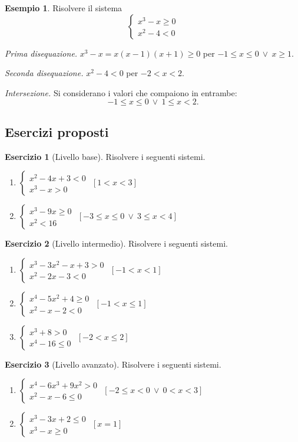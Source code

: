 \documentclass[12pt,a4paper,openany]{book}
\theoremstyle{definition}
\newtheorem{esempio}{Esempio}[section]
\newtheorem{esercizio}{Esercizio}[section]
\theoremstyle{plain}
\theoremstyle{remark}
\newcommand{\sistema}[1]{\begin{cases}#1\end{cases}}
\begin{document}
\begin{esempio}
Risolvere il sistema
\[
\sistema{x^3-x\ge 0\\ x^2-4<0}
\]

\emph{Prima disequazione.} $x^3-x=x(x-1)(x+1)\ge 0$ per $-1\le x\le 0\ \lor\ x\ge 1$.

\emph{Seconda disequazione.} $x^2-4<0$ per $-2<x<2$.

\emph{Intersezione.} Si considerano i valori che compaiono in entrambe:
\[
-1\le x\le 0\ \lor\ 1\le x<2.
\]
\end{esempio}

\subsection*{Esercizi proposti}

\begin{esercizio}[Livello base]
Risolvere i seguenti sistemi.
\begin{enumerate}[label=\alph*)]
\item $\sistema{x^2-4x+3<0\\ x^3-x>0}$ \hfill $[1<x<3]$
\item $\sistema{x^3-9x\ge 0\\ x^2<16}$ \hfill $[-3\le x\le 0\ \lor\ 3\le x<4]$
\end{enumerate}
\end{esercizio}

\begin{esercizio}[Livello intermedio]
Risolvere i seguenti sistemi.
\begin{enumerate}[label=\alph*)]
\item $\sistema{x^3-3x^2-x+3>0\\ x^2-2x-3<0}$ \hfill $[-1<x<1]$
\item $\sistema{x^4-5x^2+4\ge 0\\ x^2-x-2<0}$ \hfill $[-1<x\le 1]$
\item $\sistema{x^3+8>0\\ x^4-16\le 0}$ \hfill $[-2<x\le 2]$
\end{enumerate}
\end{esercizio}

\begin{esercizio}[Livello avanzato]
Risolvere i seguenti sistemi.
\begin{enumerate}[label=\alph*)]
\item $\sistema{x^4-6x^3+9x^2>0\\ x^2-x-6\le 0}$ \hfill $[-2\le x<0\ \lor\ 0<x<3]$
\item $\sistema{x^3-3x+2\le 0\\ x^3-x\ge 0}$ \hfill $[x=1]$
\end{enumerate}
\end{esercizio}
\end{document}
